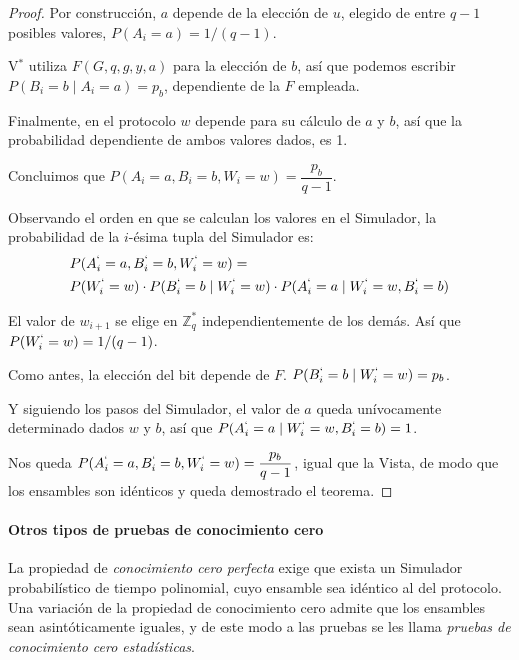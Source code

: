 \begin{proof}
	Por construcción, $a$ depende de la elección de $u$, elegido de entre $q-1$ posibles valores, $P(A_i = a) = 1/(q-1)$.
	
	V$^*$ utiliza $F(G,q,g,y,a)$ para la elección de $b$, así que podemos escribir $P(B_i = b \mid A_i = a) = p_b$, dependiente de la $F$ empleada.
	
	Finalmente, en el protocolo $w$ depende para su cálculo de $a$ y $b$, así que la probabilidad dependiente de ambos valores dados, es 1.
	
	Concluimos que $P(A_i=a, B_i=b, W_i = w) = \dfrac{p_b}{q-1}$.
	
	
	Observando el orden en que se calculan los valores en el Simulador, la probabilidad de la $i$-ésima tupla del Simulador es:
	\begin{align*}
	& P(A_i^`=a, B_i^`=b, W_i^` = w) = \\
	& P(W_i^` = w) \cdot P(B_i^` = b \mid W_i^` = w) \cdot P(A_i^` = a \mid W_i^` = w, B_i^`=b)
	\end{align*}
	
	El valor de $w_{i+1}$ se elige en $\mathbb{Z}_q^*$ independientemente de los demás. Así que $P(W_i^` = w) =  1/(q-1)$.
	
	Como antes, la elección del bit depende de $F$. $  P(B_i^` = b \mid W_i^` = w) = p_b $.
	
	Y siguiendo los pasos del Simulador, el valor de $a$ queda unívocamente determinado dados $w$ y $b$, así que $P(A_i^` = a \mid W_i^` = w, B_i^`=b) = 1$.
	
	Nos queda $ P(A_i^`=a, B_i^`=b, W_i^` = w) = \dfrac{p_b}{q-1}$, igual que la Vista, de modo que los ensambles son idénticos y queda demostrado el teorema.
	
\end{proof}


\hfil

\paragraph{Otros tipos de pruebas de conocimiento cero}

La propiedad de \textit{conocimiento cero perfecta} exige que exista un Simulador probabilístico de tiempo polinomial, cuyo ensamble sea idéntico al del protocolo. Una variación de la propiedad de conocimiento cero admite que los ensambles sean asintóticamente iguales, y de este modo a las pruebas se les llama \textit{pruebas de conocimiento cero estadísticas}.

